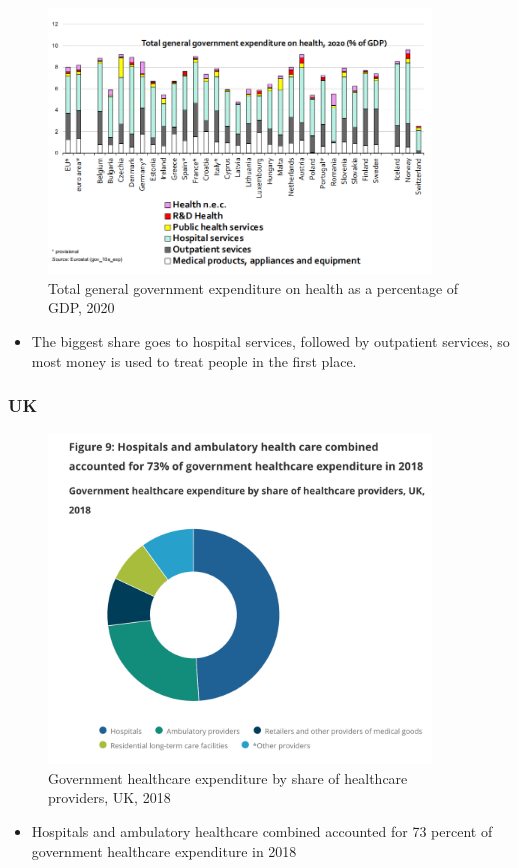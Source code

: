             \begin{figure}[H]%
                \centering
                \includegraphics[width=4in]{images/ch3/10.png}
                \caption{Total general government expenditure on health as a percentage of GDP, 2020}
            \end{figure} 
        \begin{itemize}           
            \item The biggest share goes to hospital services, followed by outpatient services, so most money is used to treat people in the first place.
        \end{itemize}
        
        \subsubsection{UK}
        \begin{figure}[H]%
                \centering
                \includegraphics[width=4in]{images/ch3/18.png}
                \caption{Government healthcare expenditure by share of healthcare providers, UK, 2018}
            \end{figure} 
 \begin{itemize}           
        \item Hospitals and ambulatory healthcare combined accounted for 73 percent of government healthcare expenditure in 2018
        \end{itemize}              

